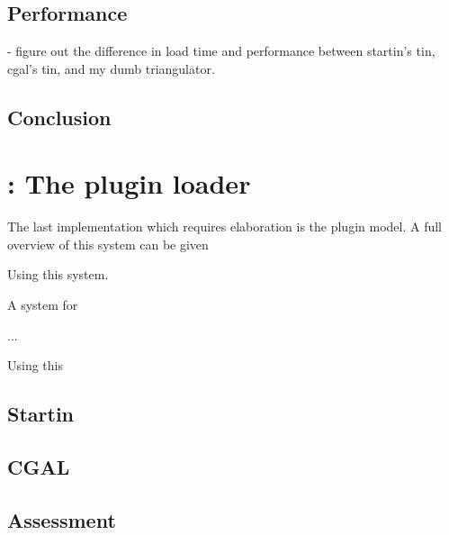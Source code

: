 \subsection{Performance}
- figure out the difference in load time and performance between startin's tin, cgal's tin, and my dumb triangulator.

\subsection{Conclusion}


\newpage

\section{\mySubRQThreeTitle: The plugin loader}
\label{sec:implementation:loading}


The last implementation which requires elaboration is the plugin model. 
A full overview of this system can be given 


Using this system. 



A system for 

...

Using this 


\subsection{ Startin }

\subsection{ CGAL }


\subsection{Assessment}

